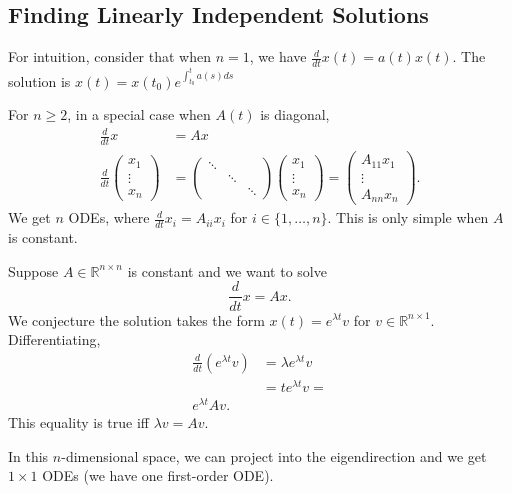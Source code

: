 \documentclass{tufte-handout}
\newcommand*\R{\mathbb{R}}
\theoremstyle{definition}
\begin{document}
\subsection{Finding Linearly Independent Solutions}

For intuition, consider that when $n=1$, we have $\frac{d}{dt} x(t) = a(t)x(t)$. The solution is $x(t) = x(t_0) e^{\int_{t_0}^{t} a(s)ds }$

For $n \ge 2$, in a special case when $A(t)$ is diagonal, 
\begin{align*}
	\frac{d}{dt}x &= Ax \\
	\frac{d}{dt}\begin{pmatrix}
	x_1 \\
	\vdots \\
	x_n
	\end{pmatrix} &= \begin{pmatrix}
	\ddots & & \\
		   & \ddots & \\
		   & & \ddots
	\end{pmatrix} \begin{pmatrix}
	x_1 \\
	\vdots \\
	x_n
	\end{pmatrix} = \begin{pmatrix}
	A_{11}x_1 \\
	\vdots \\
	A_{nn} x_n
	\end{pmatrix}
.\end{align*}
We get $n$ ODEs, where $\frac{d}{dt}x_i = A_{ii}x_i$ for $i \in \{1,\ldots,n\}$. This is only simple when $A$ is constant.

Suppose $A \in \R^{n \times  n}$ is constant and we want to solve \[
	\frac{d}{dt} x = A x
.\] We conjecture the solution takes the form $x(t) = e^{\lambda t} v$ for $v \in \R^{n \times 1}$.
Differentiating,
\begin{align*}
	\frac{d}{dt} \left( e^{\lambda t}v \right) &= \lambda e^{\lambda t}v \\
											   &= t e^{\lambda t}v =  \\ e^{\lambda t} A v
.\end{align*} This equality is true iff $\lambda v = A v$.

In this $n$-dimensional space, we can project into the eigendirection and we get $1 \times 1$ ODEs (we have one first-order ODE).
\end{document}
